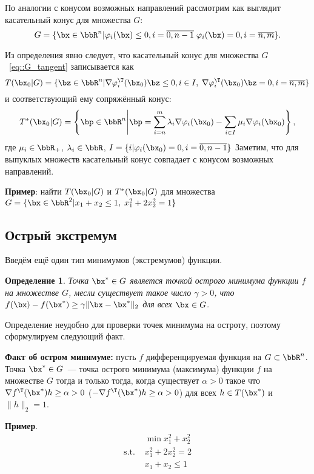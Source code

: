 \documentclass[12pt]{article}
\newtheorem{Def}{ Определение}
\begin{document}
По аналогии с конусом возможных направлений рассмотрим как выглядит касательный конус для множества $G$:
\begin{equation}
G = \{\bx \in \bbR^n | \varphi_i(\bx) \leq 0, i = \overline{0, n-1} \; \varphi_i(\bx) = 0, i = \overline{n, m} \}.
\label{eq::G_tangent}
\end{equation}

Из определения явно следует, что касательный конус для множества $G$~\eqref{eq::G_tangent} записывается как
\[
T(\bx_0|G) = \{ \bz \in \bbR^n | \nabla \varphi^{\T}_i(\bx_0)\bz \leq 0, i \in I, \; \nabla \varphi^{\T}_i(\bx_0)\bz = 0, i = \overline{n,m} \}
\]
и соответствующий ему сопряжённый конус:
\[
T^*(\bx_0|G) = \left \{ \bp \in \bbR^n \middle| \bp = \sum\limits_{i = n}^m \lambda_i \nabla \varphi_i(\bx_0) - \sum\limits_{i \in I} \mu_i \nabla \varphi_i(\bx_0) \right \},
\] 
где $\mu_i \in \bbR_+$, $\lambda_i \in \bbR$, $I = \{i | \varphi_i(\bx_0) = 0, i = \overline{0, n-1} \}$
Заметим, что для выпуклых множеств касательный конус совпадает с конусом возможных направлений.

\textbf{Пример}: найти $T(\bx_0|G)$ и $T^*(\bx_0|G)$ для множества $G = \{\bx \in \bbR^2 | x_1 + x_2 \leq 1, \; x^2_1 + 2x_2^2 = 1 \}$


\subsection{Острый экстремум}

Введём ещё один тип минимумов (экстремумов) функции.
\begin{Def}
Точка $\bx^* \in G$ является точкой острого минимума функции $f$ на множестве $G$, месли существует такое число $\gamma > 0$, что $f(\bx) - f(\bx^*) \geq \gamma \|\bx - \bx^*\|_2$ для всех $\bx \in G$.
\end{Def}

Определение неудобно для проверки точек минимума на остроту, поэтому сформулируем следующий факт.

\textbf{Факт об остром минимуме:} пусть $f$ дифференцируемая функция на $G \subset \bbR^n$. 
Точка $\bx^* \in G$~--- точка острого минимума (максимума) функции $f$ на множестве $G$ тогда и только тогда, когда существует $\alpha > 0$ такое что $\nabla f^{\T}(\bx^*) h \geq \alpha > 0$ ($-\nabla f^{\T}(\bx^*) h \geq \alpha > 0$) для всех $h \in T(\bx^*)$ и $\|h\|_2 = 1$.  

\textbf{Пример}.
\begin{equation}
\begin{split}
& \min x_1^2 + x_2^2\\
\text{s.t. } & x_1^2 + 2x_2^2 = 2\\
& x_1 + x_2 \leq 1
\end{split}
\label{eq::sharp_extr}
\end{equation}
\end{document}
